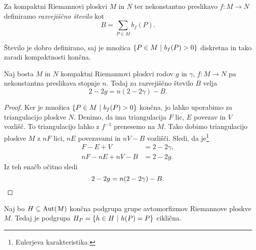 \begin{definicija}
Za kompaktni Riemannovi ploskvi $M$ in $N$ ter nekonstantno
preslikavo $f \colon M \to N$ definiramo
\emph{razvejiščno število} kot
\[
B = \sum_{P \in M} b_f(P).
\]
\end{definicija}

Število je dobro definirano, saj je množica
$\left\{P \in M~\middle\vert~b_f(P) > 0\right\}$ diskretna in tako zaradi kompaktnosti
končna.

\begin{izrek}
\label{iz:rie-hur}
Naj bosta $M$ in $N$ kompaktni Riemannovi ploskvi rodov $g$ in
$\gamma$, $f \colon M \to N$ pa nekonstantna preslikava stopnje
$n$. Tedaj za razvejiščno število $B$ velja
\[
2 - 2g = n(2 - 2 \gamma) - B.
\]
\end{izrek}

\begin{proof}
Ker je množica $\left\{P \in M~\middle\vert~b_f(P) > 0\right\}$ končna, jo lahko
uporabimo za triangulacijo ploskve $N$. Denimo, da ima
triangulacija $F$ lic, $E$ povezav in $V$ vozlišč. To
triangulacijo lahko z $f^{-1}$ prenesemo na $M$. Tako dobimo
triangulacijo ploskve $M$ z $nF$ lici, $nE$ povezavami in $nV - B$
vozlišči. Sledi, da je\footnote{Eulerjeva karakteristika.}
\begin{align*}
F - E + V &= 2 - 2 \gamma,
\\
nF - nE + nV - B &= 2 - 2g.
\end{align*}
Iz teh enačb očitno sledi
\[
2 - 2g = n(2 - 2 \gamma) - B. \qedhere
\]
\end{proof}

\begin{trditev}
Naj bo $H \subseteq \operatorname{Aut}(M)$ končna podgrupa grupe avtomorfizmov
Riemannove ploskve $M$. Tedaj je podgrupa
$H_P = \left\{h \in H~\middle\vert~h(P) = P\right\}$ ciklična.
\end{trditev}

